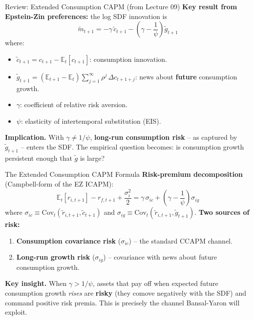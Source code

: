 \documentclass{beamer}
\newcommand{\E}{\mathbb{E}}
\newcommand{\Cov}{\mathrm{Cov}}
\newcommand{\tld}[1]{\widetilde{#1}}
\begin{document}
\begin{frame}{Review: Extended Consumption CAPM (from Lecture 09)}
    \textbf{Key result from Epstein-Zin preferences:} the log SDF innovation is
    \begin{equation}
        \tld{m}_{t+1} = -\gamma\,\tld{c}_{t+1} - \left(\gamma - \frac{1}{\psi}\right)\tld{g}_{t+1}
    \end{equation}
    where:
    \begin{itemize}
        \item $\tld{c}_{t+1} = c_{t+1} - \E_t[c_{t+1}]$: consumption innovation.
        \item $\tld{g}_{t+1} = (\E_{t+1} - \E_t)\sum_{j=1}^{\infty}\rho^j\,\Delta c_{t+1+j}$: news about \textbf{future} consumption growth.
        \item $\gamma$: coefficient of relative risk aversion.
        \item $\psi$: elasticity of intertemporal substitution (EIS).
    \end{itemize}
    \vspace{2pt}
    \textbf{Implication.} With $\gamma \neq 1/\psi$, \textbf{long-run consumption risk} -- as captured by $\tld{g}_{t+1}$ -- enters the SDF. The empirical question becomes: is consumption growth persistent enough that $\tld{g}$ is large?
\end{frame}

\begin{frame}{The Extended Consumption CAPM Formula}
    \textbf{Risk-premium decomposition} (Campbell-form of the EZ ICAPM):
    \begin{equation}
        \E_t[r_{i,t+1}] - r_{f,t+1} + \frac{\sigma_i^2}{2} = \gamma\,\sigma_{ic} + \left(\gamma - \frac{1}{\psi}\right)\sigma_{ig}
    \end{equation}
    where $\sigma_{ic}\equiv\Cov_t(\tld{r}_{i,t+1},\tld{c}_{t+1})$ and $\sigma_{ig}\equiv\Cov_t(\tld{r}_{i,t+1},\tld{g}_{t+1})$.
    \vspace{2pt}
    \textbf{Two sources of risk:}
    \begin{enumerate}
        \item \textbf{Consumption covariance risk} ($\sigma_{ic}$) -- the standard CCAPM channel.
        \item \textbf{Long-run growth risk} ($\sigma_{ig}$) -- covariance with news about future consumption growth.
    \end{enumerate}
    \vspace{2pt}
    \textbf{Key insight.} When $\gamma > 1/\psi$, assets that pay off when expected future consumption growth \textit{rises} are \textbf{risky} (they comove negatively with the SDF) and command positive risk premia. This is precisely the channel Bansal-Yaron will exploit.
\end{frame}
\end{document}
